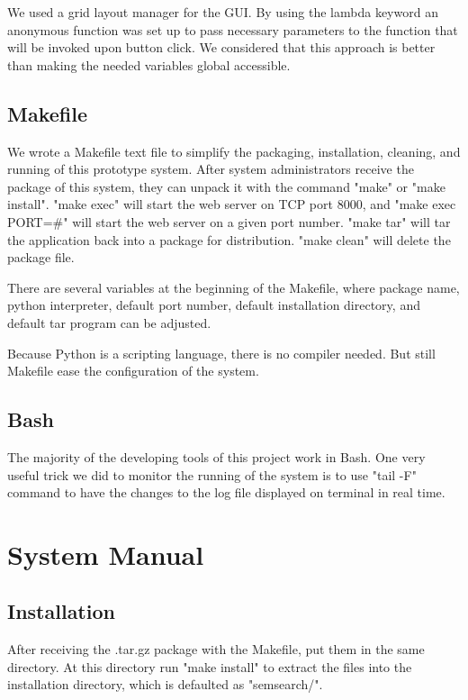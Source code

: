 \documentclass[12pt]{cls}
\begin{document}
We used a grid layout manager for the GUI. By using the lambda keyword an anonymous function was set up to pass necessary parameters to the function that will be invoked upon button click. We considered that this approach is better than making the needed variables global accessible.

\section{Makefile}

We wrote a Makefile text file to simplify the packaging, installation, cleaning, and running of this prototype system. After system administrators receive the package of this system, they can unpack it with the command "make" or "make install". "make exec" will start the web server on TCP port 8000, and "make exec PORT=\#" will start the web server on a given port number. "make tar" will tar the application back into a package for distribution. "make clean" will delete the package file.

There are several variables at the beginning of the Makefile, where package name, python interpreter, default port number, default installation directory, and default tar program can be adjusted.

Because Python is a scripting language, there is no compiler needed. But still Makefile ease the configuration of the system.

\section{Bash}

The majority of the developing tools of this project work in Bash. One very useful trick we did to monitor the running of the system is to use "tail -F" command to have the changes to the log file displayed on terminal in real time.

\chapter{System Manual}

\section{Installation}

After receiving the .tar.gz package with the Makefile, put them in the same directory. At this directory run "make install" to extract the files into the installation directory, which is defaulted as "semsearch/".
\end{document}
